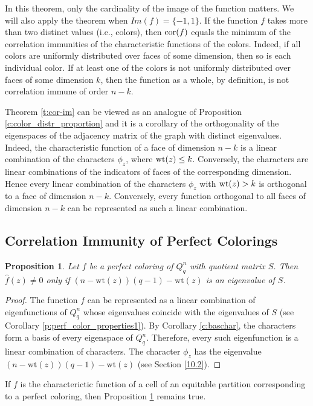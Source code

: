 \documentclass[11pt]{article}
\newtheorem{claim}{Proposition}[section]
\theoremstyle{definition}
\newcommand{\wt}{{\rm wt}}
\newcommand{\cor}{{\rm cor}}
\begin{document}
{{{In this theorem, only the cardinality of the image of the function matters.
 We will also apply the theorem   when $Im(f)=\{-1,1\}$.
If the function $f$ takes more than two distinct values (i.e., colors),
then $\cor(f)$ equals the minimum of the correlation immunities
of the characteristic functions of the colors. Indeed, if all colors
are uniformly distributed over faces of some dimension, then so is
each individual color. If at least one of the colors is not
uniformly distributed over faces of some dimension $k$, then the
function as a whole, by definition, is not correlation immune
of order $n-k$.

 Theorem \ref{t:cor-im} can be viewed as an
analogue of Proposition \ref{c:color_distr_proportion} and it is a corollary
of the orthogonality of the eigenspaces of the adjacency matrix of the graph with
distinct eigenvalues. Indeed, the characteristic
function of a face of dimension $n-k$ is a linear combination of
the characters $\phi_z$, where $\wt(z)\leq k$. Conversely, the
characters are linear combinations of the indicators of faces of the corresponding
dimension. Hence every linear combination of the characters
$\phi_z$ with $\wt(z)> k$ is orthogonal to a face of dimension $n-k$.
Conversely, every function orthogonal to all faces of dimension
$n-k$ can be represented as such a linear combination.

\subsection{Correlation Immunity of Perfect Colorings}

\begin{claim}\label{c:cor_immun_for_perfect_coloring0}
    Let $f$ be a perfect coloring of $Q^n_q$ with quotient
    matrix $S$. Then $\widehat{f}(z)\neq 0$ only if
$(n-\mathrm{wt}(z))(q-1)-\mathrm{wt}(z)$ is an eigenvalue of $S$.
\end{claim}
\begin{proof}
 The function $f$ can be
represented as a linear combination of eigenfunctions of 
$Q^n_q$ whose eigenvalues coincide with the eigenvalues of  $S$ (see
Corollary \ref{p:perf_color_properties1}). By
Corollary \ref{c:baschar}, the characters form a basis of every
eigenspace of $Q^n_q$. Therefore, every such eigenfunction is a linear combination of characters.  The character $\phi_z$ has the eigenvalue
$(n-\mathrm{wt}(z))(q-1)-\mathrm{wt}(z)$ (see Section \ref{10.2}).
\end{proof}

If $f$ is the characterictic function of a cell of an   equitable partition corresponding to a perfect coloring, then Proposition \ref{c:cor_immun_for_perfect_coloring0} remains true.

}}}
\end{document}
